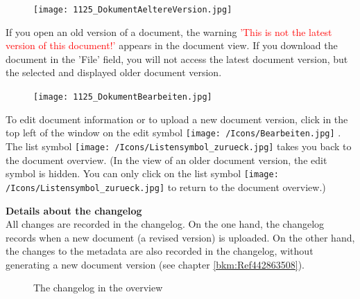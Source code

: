 \begin{figure}
\vspace{-15pt}
\texttt{[image: 1125\_DokumentAeltereVersion.jpg]}
\end{figure}
If you open an old version of a document, the warning \textcolor{red}{'This is not the latest version of this document!'} appears in the document view. If you download the document in the 'File' field, you will not access the latest document version, but the selected and displayed older document version.

\begin{figure}
\texttt{[image: 1125\_DokumentBearbeiten.jpg]}
\end{figure}
To edit document information or to upload a new document version, click in the top left of the window on the edit symbol \texttt{[image: /Icons/Bearbeiten.jpg]} . The list symbol \texttt{[image: /Icons/Listensymbol\_zurueck.jpg]}  takes you back to the document overview. (In the view of an older document version, the edit symbol is hidden. You can only click on the list symbol \texttt{[image: /Icons/Listensymbol\_zurueck.jpg]} to return to the document overview.)

\vspace{\baselineskip}

\textbf{Details about the changelog} \\
All changes are recorded in the changelog. On the one hand, the changelog records when a new document (a revised version) is uploaded. On the other hand, the changes to the metadata are also recorded in the changelog, without generating a new document version (see chapter \ref{bkm:Ref442863508}).

\begin{figure}[H]
\caption{The changelog in the overview}
\end{figure}

